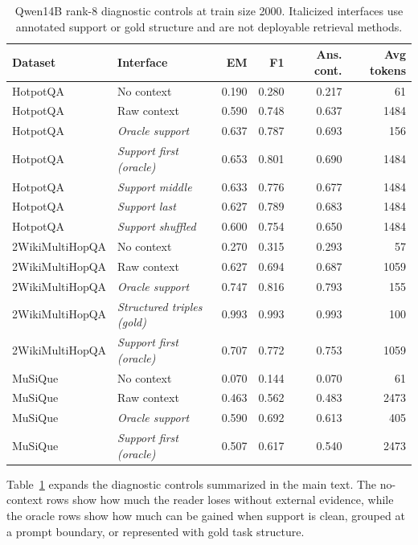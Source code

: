 \documentclass[a4paper,fleqn]{cas-sc}
\begin{document}
\begin{table}[!hbp]
\centering
\caption{Qwen14B rank-8 diagnostic controls at train size 2000. Italicized
interfaces use annotated support or gold structure and are not deployable
retrieval methods.}
\label{tab:appendix-qwen14b-diagnostic-controls}
\scriptsize
\setlength{\tabcolsep}{4pt}
\begin{tabular}{llrrrr}
\toprule
Dataset & Interface & EM & F1 & Ans. cont. & Avg tokens \\
\midrule
HotpotQA & No context & 0.190 & 0.280 & 0.217 & 61 \\
HotpotQA & Raw context & 0.590 & 0.748 & 0.637 & 1484 \\
HotpotQA & \emph{Oracle support} & 0.637 & 0.787 & 0.693 & 156 \\
HotpotQA & \emph{Support first (oracle)} & 0.653 & 0.801 & 0.690 & 1484 \\
HotpotQA & \emph{Support middle} & 0.633 & 0.776 & 0.677 & 1484 \\
HotpotQA & \emph{Support last} & 0.627 & 0.789 & 0.683 & 1484 \\
HotpotQA & \emph{Support shuffled} & 0.600 & 0.754 & 0.650 & 1484 \\
\midrule
2WikiMultiHopQA & No context & 0.270 & 0.315 & 0.293 & 57 \\
2WikiMultiHopQA & Raw context & 0.627 & 0.694 & 0.687 & 1059 \\
2WikiMultiHopQA & \emph{Oracle support} & 0.747 & 0.816 & 0.793 & 155 \\
2WikiMultiHopQA & \emph{Structured triples (gold)} & 0.993 & 0.993 & 0.993 & 100 \\
2WikiMultiHopQA & \emph{Support first (oracle)} & 0.707 & 0.772 & 0.753 & 1059 \\
\midrule
MuSiQue & No context & 0.070 & 0.144 & 0.070 & 61 \\
MuSiQue & Raw context & 0.463 & 0.562 & 0.483 & 2473 \\
MuSiQue & \emph{Oracle support} & 0.590 & 0.692 & 0.613 & 405 \\
MuSiQue & \emph{Support first (oracle)} & 0.507 & 0.617 & 0.540 & 2473 \\
\bottomrule
\end{tabular}
\end{table}

Table~\ref{tab:appendix-qwen14b-diagnostic-controls} expands the diagnostic
controls summarized in the main text. The no-context rows show how much the
reader loses without external evidence, while the oracle rows show how much can
be gained when support is clean, grouped at a prompt boundary, or represented with
gold task structure.
\end{document}
